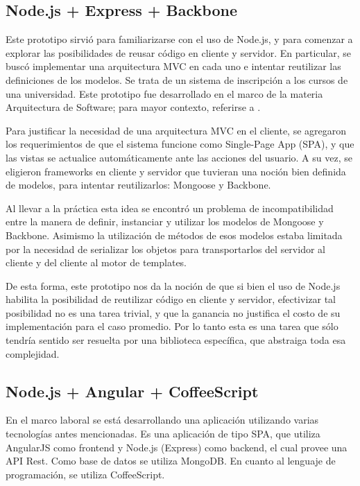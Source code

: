 \documentclass[doc,helv,longtable]{article}
\begin{document}
\subsection{Node.js + Express + Backbone}
Este prototipo\cite{arqrepo} sirvió para familiarizarse con el uso de Node.js, y para comenzar a explorar las posibilidades de reusar código en cliente y servidor. En particular, se buscó implementar una arquitectura MVC en cada uno e intentar reutilizar las definiciones de los modelos. Se trata de un sistema de inscripción a los cursos de una universidad. Este prototipo fue desarrollado en el marco de la materia Arquitectura de Software; para mayor contexto, referirse a \cite{arqdoc}.

Para justificar la necesidad de una arquitectura MVC en el cliente, se agregaron los requerimientos de que el sistema funcione como Single-Page App (SPA)\cite{spa}, y que las vistas se actualice automáticamente ante las acciones del usuario. A su vez, se eligieron frameworks en cliente y servidor que tuvieran una noción bien definida de modelos, para intentar reutilizarlos: Mongoose\cite{mongoose} y Backbone.

Al llevar a la práctica esta idea se encontró un problema de incompatibilidad entre la manera de definir, instanciar y utilizar los modelos de Mongoose y Backbone. Asimismo la utilización de métodos de esos modelos estaba limitada por la necesidad de serializar los objetos para transportarlos del servidor al cliente y del cliente al motor de templates.

De esta forma, este prototipo nos da la noción de que si bien el uso de Node.js habilita la posibilidad de reutilizar código en cliente y servidor, efectivizar tal posibilidad no es una tarea trivial, y que la ganancia no justifica el costo de su implementación para el caso promedio. Por lo tanto esta es una tarea que sólo tendría sentido ser resuelta por una biblioteca específica, que abstraiga toda esa complejidad.

\subsection{Node.js + Angular + CoffeeScript}
En el marco laboral se está desarrollando una aplicación\cite{acekia} utilizando varias tecnologías antes mencionadas. Es una aplicación de tipo SPA\cite{spa}, que utiliza AngularJS como frontend y Node.js (Express) como backend, el cual provee una API Rest. Como base de datos se utiliza MongoDB\cite{mongo}. En cuanto al lenguaje de programación, se utiliza CoffeeScript. 
\end{document}

